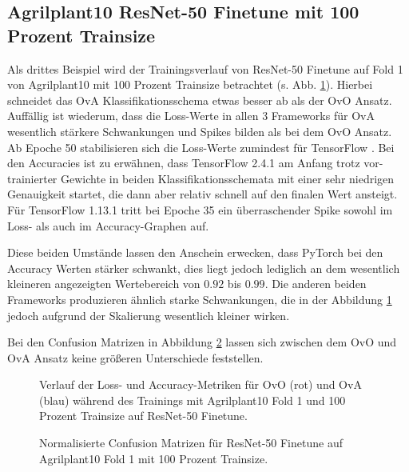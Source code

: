 \subsection{Agrilplant10 ResNet-50 Finetune mit 100 Prozent Trainsize}
\label{ch:BeispielC}
Als drittes Beispiel wird der Trainingsverlauf von ResNet-50 Finetune auf Fold 1 von Agrilplant10 mit 100 Prozent Trainsize betrachtet (s. Abb. \ref{fig:TrainingsverlaufC}).
Hierbei schneidet das OvA Klassifikationsschema etwas besser ab als der OvO Ansatz. Auffällig ist wiederum, dass die Loss-Werte in allen 3 Frameworks für OvA wesentlich stärkere Schwankungen und Spikes bilden als bei dem OvO Ansatz. Ab Epoche 50 stabilisieren sich die Loss-Werte zumindest für TensorFlow \cite{tensorflow}.
Bei den Accuracies ist zu erwähnen, dass TensorFlow 2.4.1 \cite{tensorflow} am Anfang trotz vor-trainierter Gewichte in beiden Klassifikationsschemata mit einer sehr niedrigen Genauigkeit startet, die dann aber relativ schnell auf den finalen Wert ansteigt. Für TensorFlow 1.13.1 \cite{tensorflow} tritt bei Epoche 35 ein überraschender Spike sowohl im Loss- als auch im Accuracy-Graphen auf.

Diese beiden Umstände lassen den Anschein erwecken, dass PyTorch \cite{pytorch} bei den Accuracy Werten stärker schwankt, dies liegt jedoch lediglich an dem wesentlich kleineren angezeigten Wertebereich von $0.92$ bis $0.99$. Die anderen beiden Frameworks produzieren ähnlich starke Schwankungen, die in der Abbildung \ref{fig:TrainingsverlaufC} jedoch aufgrund der Skalierung wesentlich kleiner wirken.

Bei den Confusion Matrizen in Abbildung \ref{fig:ConfusionMatrixC} lassen sich zwischen dem OvO und OvA Ansatz keine größeren Unterschiede feststellen.

\begin{figure}[H]
\begin{adjustbox}{width=1.4\textwidth, center}

\end{adjustbox}
\caption{Verlauf der Loss- und Accuracy-Metriken für OvO (rot) und OvA (blau) während des Trainings mit Agrilplant10 Fold 1 und 100 Prozent Trainsize auf ResNet-50 Finetune.}
\label{fig:TrainingsverlaufC}
\end{figure}

\begin{figure}[H]
\begin{adjustbox}{width=1.1\textwidth, center}

\end{adjustbox}
\caption{Normalisierte Confusion Matrizen für ResNet-50 Finetune auf Agrilplant10 Fold 1 mit 100 Prozent Trainsize.}
\label{fig:ConfusionMatrixC}
\end{figure}

